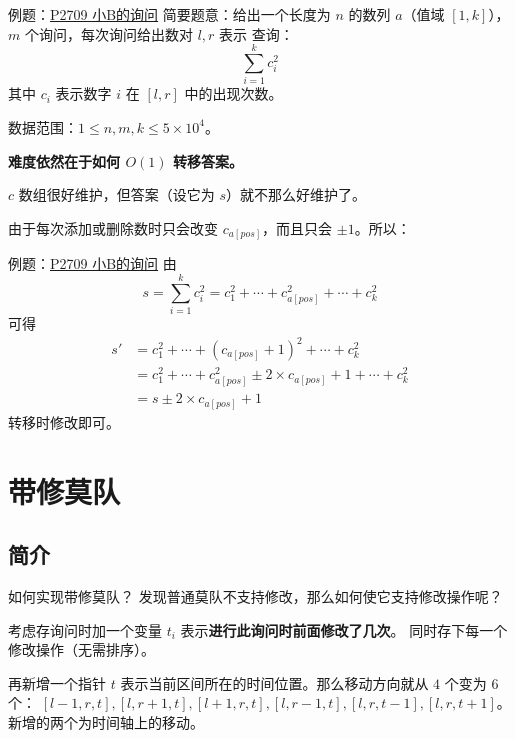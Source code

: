 \documentclass[table]{beamer}
\begin{document}
\begin{frame}
{例题：{\color{blue}\href{https://www.luogu.com.cn/problem/P2709}{P2709 小B的询问}}}
	简要题意：给出一个长度为 $n$ 的数列 $a$（值域 $[1,k]$），$m$ 个询问，每次询问给出数对 $l,r$ 表示
	查询：  
	$$\sum\limits_{i=1}^k c_i^2$$
	其中 $c_i$ 表示数字 $i$ 在 $[l,r]$ 中的出现次数。  

	数据范围：$1\le n,m,k \le 5\times 10^4$。
	\pause

	\textbf{难度依然在于如何 $O(1)$ 转移答案。}
	\pause

	$c$ 数组很好维护，但答案（设它为 $s$）就不那么好维护了。

	由于每次添加或删除数时只会改变 $c_{a[pos]}$，而且只会 $\pm1$。所以：
\end{frame}

\begin{frame}
{例题：{\color{blue}\href{https://www.luogu.com.cn/problem/P2709}{P2709 小B的询问}}}
	由
	$$
	s=\sum\limits_{i=1}^k c_i^2=c_1^2+\cdots+c_{a[pos]}^2+\cdots+c_k^2
	$$
	可得
	$$
	\begin{aligned}
		s'&=c_1^2+\cdots+(c_{a[pos]}+1)^2+\cdots+c_k^2\\
		&=c_1^2+\cdots+c_{a[pos]}^2\pm2\times c_{a[pos]}+1+\cdots+c_k^2\\
		&=s\pm2\times c_{a[pos]}+1
	\end{aligned}
	$$
	转移时修改即可。
\end{frame}

\section{带修莫队}

\subsection{简介}
\begin{frame}{如何实现带修莫队？}
	发现普通莫队不支持修改，那么如何使它支持修改操作呢？

	考虑存询问时加一个变量 $t_i$ 表示\textbf{进行此询问时前面修改了几次}。
	同时存下每一个修改操作（无需排序）。

	再新增一个指针 $t$ 表示当前区间所在的时间位置。那么移动方向就从 $4$ 个变为 $6$ 个：
	$[l-1,r,t],[l,r+1,t],[l+1,r,t],[l,r-1,t],[l,r,t-1],[l,r,t+1]$。新增的两个为时间轴上的移动。
\end{frame}
\end{document}
